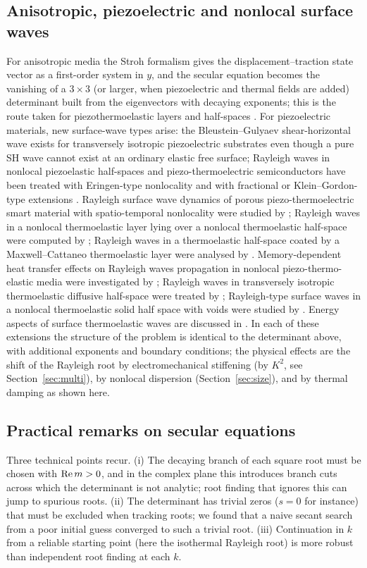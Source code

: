 \subsection{Anisotropic, piezoelectric and nonlocal surface waves}
For anisotropic media the Stroh formalism \citep{Stroh1958,Stroh1962} gives the displacement--traction state vector as a first-order system in $y$, and the secular equation becomes the vanishing of a $3\times3$ (or larger, when piezoelectric and thermal fields are added) determinant built from the eigenvectors with decaying exponents; this is the route taken for piezothermoelastic layers and half-spaces \citep{Biswas2020}. For piezoelectric materials, new surface-wave types arise: the Bleustein--Gulyaev shear-horizontal wave exists for transversely isotropic piezoelectric substrates even though a pure SH wave cannot exist at an ordinary elastic free surface; Rayleigh waves in nonlocal piezoelastic half-spaces and piezo-thermoelectric semiconductors have been treated with Eringen-type nonlocality and with fractional or Klein--Gordon-type extensions \citep{Tung2019,Gupta2024,Aldandani2026,Lazar2022}. Rayleigh surface wave dynamics of porous piezo-thermoelectric smart material with spatio-temporal nonlocality were studied by \citep{Aldandani2026a}; Rayleigh waves in a nonlocal thermoelastic layer lying over a nonlocal thermoelastic half-space were computed by \citep{Biswas2020b}; Rayleigh waves in a thermoelastic half-space coated by a Maxwell--Cattaneo thermoelastic layer were analysed by \citep{Chirita2024}. Memory-dependent heat transfer effects on Rayleigh waves propagation in nonlocal piezo-thermo-elastic media were investigated by \citep{Gupta2024b}; Rayleigh waves in transversely isotropic thermoelastic diffusive half-space were treated by \citep{Kumar2008a}; Rayleigh-type surface waves in a nonlocal thermoelastic solid half space with voids were studied by \citep{Singh2020e}. Energy aspects of surface thermoelastic waves are discussed in \citep{IvanovSavova1991}. In each of these extensions the structure of the problem is identical to the determinant above, with additional exponents and boundary conditions; the physical effects are the shift of the Rayleigh root by electromechanical stiffening (by $K^2$, see Section~\ref{sec:multi}), by nonlocal dispersion (Section~\ref{sec:size}), and by thermal damping as shown here.

\subsection{Practical remarks on secular equations}
Three technical points recur. (i) The decaying branch of each square root must be chosen with $\operatorname{Re} m>0$, and in the complex plane this introduces branch cuts across which the determinant is not analytic; root finding that ignores this can jump to spurious roots. (ii) The determinant has trivial zeros ($s=0$ for instance) that must be excluded when tracking roots; we found that a naive secant search from a poor initial guess converged to such a trivial root. (iii) Continuation in $k$ from a reliable starting point (here the isothermal Rayleigh root) is more robust than independent root finding at each $k$.

